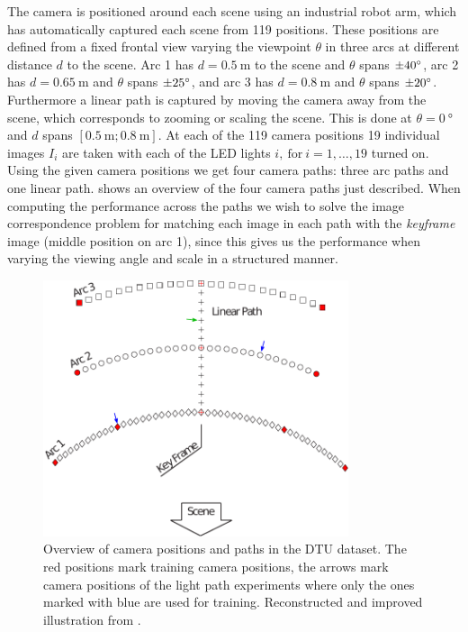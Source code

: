 \documentclass[thesis.tex]{subfiles}
\begin{document}
The camera is positioned around each scene using an industrial robot arm, which has automatically captured each scene from 119 positions. These positions are defined from a fixed frontal view varying the viewpoint $\theta$ in three arcs at different distance $d$ to the scene. Arc 1 has $d = \SI{0.5}{\meter}$ to the scene and $\theta$ spans $\SI{\pm40}{\degree}$, arc 2 has $d = \SI{0.65}{\meter}$ and $\theta$ spans $\SI{\pm25}{\degree}$, and arc 3 has $d = \SI{0.8}{\meter}$ and $\theta$ spans $\SI{\pm20}{\degree}$. Furthermore a linear path is captured by moving the camera away from the scene, which corresponds to zooming or scaling the scene. This is done at $\theta = \SI{0}{\degree}$ and $d$ spans $[\SI{0.5}{\meter};\SI{0.8}{\meter} ]$. At each of the 119 camera positions 19 individual images $I_i$ are taken with each of the LED lights $i,~\text{for}~i = 1,\hdots,19$ turned on. Using the given camera positions we get four camera paths: three arc paths and one linear path.  shows an overview of the four camera paths just described. When computing the performance across the paths we wish to solve the image correspondence problem for matching each image in each path with the \emph{keyframe} image (middle position on arc 1), since this gives us the performance when varying the viewing angle and scale in a structured manner.
%
\begin{figure}[tb]
	\centering
	\includegraphics[width=0.8\textwidth]{img/CameraPosbOwn.pdf}
	\caption{Overview of camera positions and paths in the DTU dataset. The red positions mark training camera positions, the arrows mark camera positions of the light path experiments where only the ones marked with blue are used for training. Reconstructed and improved illustration from \citet[Figure 3, pp. 3]{aanaes2010recall}.}
	\label{fig:dtu_overview}
\end{figure}
\end{document}
